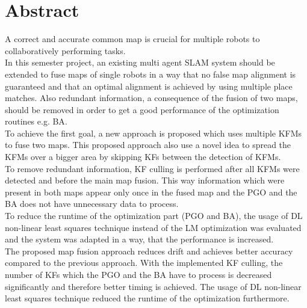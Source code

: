 \chapter*{Abstract}

A correct and accurate common map is crucial for multiple robots to collaboratively performing tasks.\\

In this semester project, an existing multi agent \ac{SLAM} system should be extended to fuse maps of single robots in a way that no false map alignment is guaranteed and that an optimal alignment is achieved by using multiple place matches. Also redundant information, a consequence of the fusion of two maps, should be removed in order to get a good performance of the optimization routines e.g. \ac{BA}.\\

To achieve the first goal, a new approach is proposed which uses multiple \acfp{KFM} to fuse two maps. This proposed approach also use a novel idea to spread the \acp{KFM} over a bigger area by skipping \acfp{KF} between the detection of \acp{KFM}.\\
To remove redundant information, \ac{KF} culling is performed after all \acp{KFM} were detected and before the main map fusion. This way information which were present in both maps appear only once in the fused map and the \ac{PGO} and the \ac{BA} does not have unnecessary data to process.\\
To reduce the runtime of the optimization part (\ac{PGO} and \ac{BA}), the usage of \acf{DL} non-linear least squares technique instead of the \acf{LM} optimization was evaluated and the system was adapted in a way, that the performance is increased.\\

The proposed map fusion approach reduces drift and achieves better accuracy compared to the previous approach. With the implemented \ac{KF} culling, the number of \acp{KF} which the \ac{PGO} and the \ac{BA} have to process is decreased significantly and therefore better timing is achieved. The usage of \ac{DL} non-linear least squares technique reduced the runtime of the optimization furthermore.
